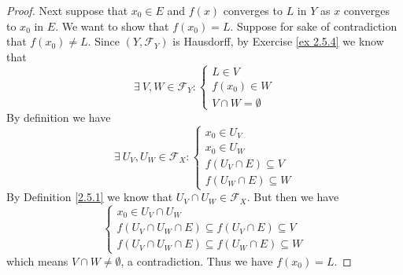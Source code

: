 \begin{proof}
    Next suppose that \(x_0 \in E\) and \(f(x)\) converges to \(L\) in \(Y\) as \(x\) converges to \(x_0\) in \(E\).
    We want to show that \(f(x_0) = L\).
    Suppose for sake of contradiction that \(f(x_0) \neq L\).
    Since \((Y, \mathcal{F}_Y)\) is Hausdorff, by Exercise \ref{ex 2.5.4} we know that
    \[
        \exists\ V, W \in \mathcal{F}_Y : \begin{cases}
            L \in V      \\
            f(x_0) \in W \\
            V \cap W = \emptyset
        \end{cases}
    \]
    By definition we have
    \[
        \exists\ U_V, U_W \in \mathcal{F}_X : \begin{cases}
            x_0 \in U_V               \\
            x_0 \in U_W               \\
            f(U_V \cap E) \subseteq V \\
            f(U_W \cap E) \subseteq W
        \end{cases}
    \]
    By Definition \ref{2.5.1} we know that \(U_V \cap U_W \in \mathcal{F}_X\).
    But then we have
    \[
        \begin{cases}
            x_0 \in U_V \cap U_W                                       \\
            f(U_V \cap U_W \cap E) \subseteq f(U_V \cap E) \subseteq V \\
            f(U_V \cap U_W \cap E) \subseteq f(U_W \cap E) \subseteq W
        \end{cases}
    \]
    which means \(V \cap W \neq \emptyset\), a contradiction.
    Thus we have \(f(x_0) = L\).


\end{proof}
